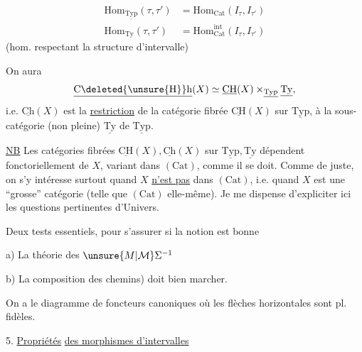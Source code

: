 \[
\begin{aligned}
\mathrm{Hom}_{\underline{\mathrm{Typ}}}(\tau,\tau')&=\mathrm{Hom}_{\mathrm{Cat}}(I_\tau,I_{\tau'})\\
\mathrm{Hom}_{\mathrm{Ty}}(\tau,\tau')&=\mathrm{Hom}^{\mathrm{int}}_{\mathrm{Cat}}(I_\tau,I_{\tau'})
\end{aligned}
\]
(hom. respectant la structure d'intervalle)

On aura
\[
\underline{\mathrm{C}\deleted{\unsure{\mathrm{H}}}\mathrm{h}}(X)\simeq \underline{\mathrm{CH}}(X)\mathbin{\times}_{\underline{\mathrm{Typ}}}\underline{\mathrm{Ty}},
\]
i.e. $\underline{\mathrm{Ch}}(X)$ est la \uline{restriction} de la catégorie fibrée $\underline{\mathrm{CH}}(X)$ sur $\underline{\mathrm{Typ}}$, à la sous-catégorie (non pleine) $\underline{\mathrm{Ty}}$ de $\underline{\mathrm{Typ}}$.

\uline{NB} Les catégories fibrées $\underline{\mathrm{CH}}(X),\underline{\mathrm{Ch}}(X)$ sur $\underline{\mathrm{Typ}},\underline{\mathrm{Ty}}$ dépendent fonctoriellement de $X$, variant dans $(\mathrm{Cat})$, comme il se doit. Comme de juste, on s'y intéresse surtout quand $X$ \uline{n'est pas} dans $(\mathrm{Cat})$, i.e. quand $X$ est une ``grosse'' catégorie (telle que $(\mathrm{Cat})$ elle-même). Je me dispense d'expliciter ici les questions pertinentes d'Univers.

Deux tests essentiels, pour s'assurer si la notion est bonne

a) La théorie des $\unsure{M|\mathcal M}\Sigma^{-1}$

b) La composition des chemins) doit bien marcher.

On a le diagramme de foncteurs canoniques
où les flèches horizontales sont pl. fidèles.

5. \uline{Propriétés}  \uline{des morphismes d'intervalles}

